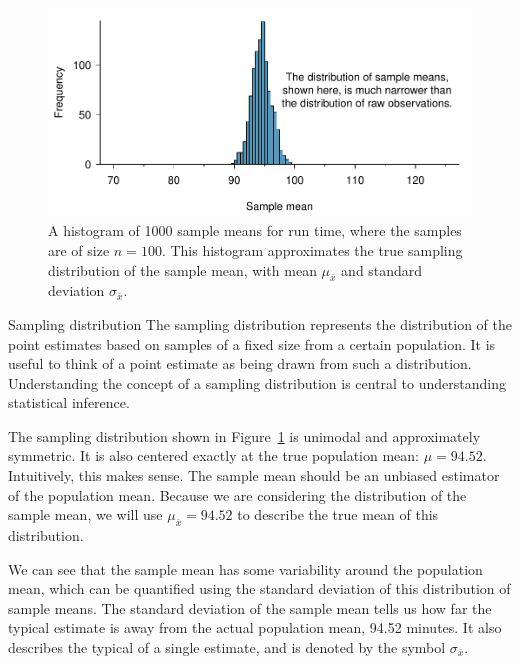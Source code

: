 \begin{figure}[h]
   \centering
   \includegraphics[width=\textwidth]{ch_distributions/figures/netTime1000SamplingDistribution/netTime1000SamplingDistribution}
   \caption{A histogram of 1000 sample means for run time, where the samples are of size $n=100$. This histogram approximates the true sampling distribution of the sample mean, with mean $\mu_{\bar{x}}$ and standard deviation $\sigma_{\bar{x}}$.}
   \label{netTime1000SamplingDistribution}
\end{figure}

\begin{onebox}{Sampling distribution}
The sampling distribution represents the distribution of the point estimates based on samples of a fixed size from a certain population. It is useful to think of a point estimate as being drawn from such a distribution. Understanding the concept of a sampling distribution is central to understanding statistical inference.\end{onebox}


The sampling distribution shown in Figure~\ref{netTime1000SamplingDistribution} is unimodal and approximately symmetric. It is also centered exactly at the true population mean: $\mu=94.52$. Intuitively, this makes sense. The sample mean should be an unbiased estimator of the population mean. Because we are considering the distribution of the sample mean, we will use $\mu_{\bar{x}} = 94.52$ to describe the true mean of this distribution.

\D{\newpage}

We can see that the sample mean has some variability around the population mean, which can be quantified using the standard deviation of this distribution of sample means. The standard deviation of the sample mean tells us how far the typical estimate is away from the actual population mean, 94.52 minutes. It also describes the typical  of a single estimate, and is denoted by the symbol $\sigma_{\bar{x}}$. 

